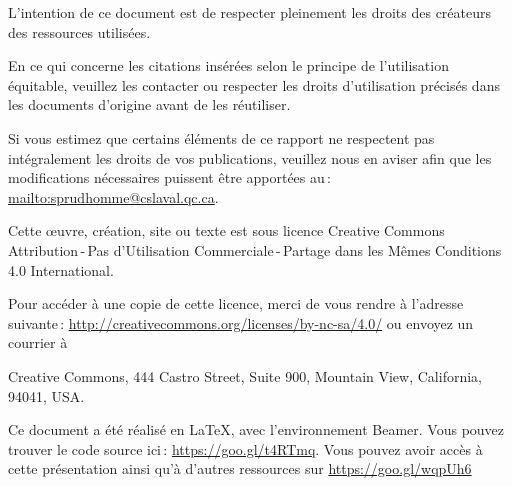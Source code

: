 		
		
		
		                
						
\nocite{stc2014a}	
\nocite{grant2002a}
\nocite{grant2002b}
\nocite{Perfetti2003a}	
\nocite{Usability2013a}
\nocite{fast2002a}	
\nocite{light2001a}
\nocite{spool2001a}
\nocite{woolrych2001a}
\nocite{fleming1998a}
\nocite{kuniavsky1998a}
\nocite{gordon2000a}	
\nocite{kirby2000a}	
\nocite{nielsen2000a}
\nocite{rubin2008handbook}		
\nocite{dumas1999practical}	
				
\framebreak
\par L’intention de ce document est de respecter pleinement les droits des créateurs des ressources
utilisées.
	\par En ce qui concerne les citations insérées selon le principe de l'utilisation équitable, veuillez les contacter ou respecter les droits d’utilisation précisés dans les documents d’origine avant de les réutiliser.
	\par Si vous estimez que certains éléments de ce rapport ne respectent pas intégralement les droits de vos
publications, veuillez nous en aviser afin que les modifications nécessaires puissent être apportées au\,: \url{mailto:sprudhomme@cslaval.qc.ca}.
	\par Cette \oe uvre, création, site ou texte est sous licence Creative Commons Attribution\,-\,Pas d’Utilisation Commerciale\,-\,Partage dans les Mêmes Conditions 4.0 International. \\
	\par 
	 Pour accéder à une copie de cette licence, merci de vous rendre à l'adresse suivante\,: \url{http://creativecommons.org/licenses/by-nc-sa/4.0/} ou envoyez un courrier à 

\par Creative Commons, 444 Castro Street, Suite 900, Mountain View, California, 94041, USA.
\par Ce document a été réalisé en \LaTeX, avec l'environnement Beamer. Vous pouvez trouver le code source ici\,: \url{https://goo.gl/t4RTmq}. Vous pouvez avoir accès à cette présentation ainsi qu'à d'autres ressources sur \url {https://goo.gl/wqpUh6}


